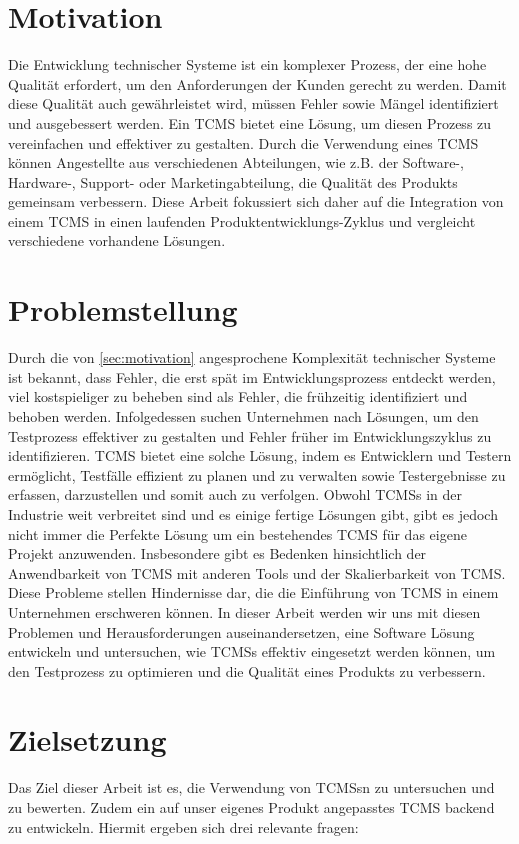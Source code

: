 \documentclass[a4paper, fontsize=11pt, parskip=half, twoside]{scrreprt}
\begin{document}
	
	\section{Motivation} \label{sec:motivation}
	Die Entwicklung technischer Systeme ist ein komplexer Prozess, der eine hohe Qualität erfordert, um den Anforderungen der Kunden gerecht zu werden. 
	Damit diese Qualität auch gewährleistet wird, müssen Fehler sowie Mängel identifiziert und ausgebessert werden. 
	Ein \ac{TCMS} bietet eine Lösung, um diesen Prozess zu vereinfachen und effektiver zu gestalten. 
	Durch die Verwendung eines \ac{TCMS} können Angestellte aus verschiedenen Abteilungen, wie z.B. der Software-, Hardware-, Support- oder Marketingabteilung, die Qualität des Produkts gemeinsam verbessern. 
	Diese Arbeit fokussiert sich daher auf die Integration von einem \ac{TCMS} in einen laufenden Produktentwicklungs-Zyklus und vergleicht verschiedene vorhandene Lösungen.
	
	\section{Problemstellung}
	Durch die von \autoref{sec:motivation} angesprochene Komplexität technischer Systeme ist bekannt, dass Fehler, die erst spät im Entwicklungsprozess entdeckt werden, viel kostspieliger zu beheben sind als Fehler, die frühzeitig identifiziert und behoben werden. 
	Infolgedessen suchen Unternehmen nach Lösungen, um den Testprozess effektiver zu gestalten und Fehler früher im Entwicklungszyklus zu identifizieren. 
	\ac{TCMS} bietet eine solche Lösung, indem es Entwicklern und Testern ermöglicht, Testfälle effizient zu planen und zu verwalten sowie Testergebnisse zu erfassen, darzustellen und somit auch zu verfolgen. 
	Obwohl \aclp{TCMS} in der Industrie weit verbreitet sind und es einige fertige Lösungen gibt, gibt es jedoch nicht immer die Perfekte Lösung um ein bestehendes \ac{TCMS} für das eigene Projekt anzuwenden. 
	Insbesondere gibt es Bedenken hinsichtlich der Anwendbarkeit von \ac{TCMS} mit anderen Tools und der Skalierbarkeit von \ac{TCMS}. 
	Diese Probleme stellen Hindernisse dar, die die Einführung von \ac{TCMS} in einem Unternehmen erschweren können. 
	In dieser Arbeit werden wir uns mit diesen Problemen und Herausforderungen auseinandersetzen, eine Software Lösung entwickeln und untersuchen, wie \aclp{TCMS} effektiv eingesetzt werden können, um den Testprozess zu optimieren und die Qualität eines Produkts zu verbessern.
	
	\section{Zielsetzung}
	Das Ziel dieser Arbeit ist es, die Verwendung von \aclp{TCMS}n zu untersuchen und zu bewerten. 
	Zudem ein auf unser eigenes Produkt angepasstes \ac{TCMS} backend zu entwickeln. 
	Hiermit ergeben sich drei relevante fragen:
	
\end{document}
